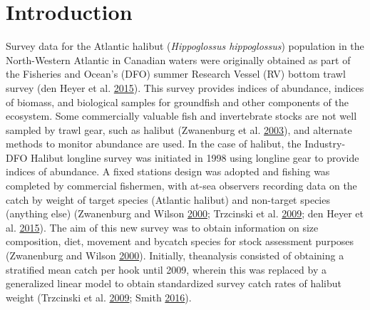 \documentclass[12pt]{article}\usepackage[]{graphicx}\usepackage[]{color}
\begin{document}

\frontmatter


\renewcommand{\headrulewidth}{0.5pt}  %
\renewcommand{\footrulewidth}{0.5pt}  %

\newcommand{\lt}{\ensuremath <}
\newcommand{\gt}{\ensuremath >}


\hypertarget{sec:introduction}{%
\section{Introduction}\label{sec:introduction}}

Survey data for the Atlantic halibut (\emph{Hippoglossus hippoglossus}) population in the North-Western Atlantic in Canadian waters were originally obtained as part of the Fisheries and Ocean's (DFO) summer Research Vessel (RV) bottom trawl survey (den Heyer et al. \protect\hyperlink{ref-DenHeyer2015}{2015}). This survey provides indices of abundance, indices of biomass, and biological samples for groundfish and other components of the ecosystem. Some commercially valuable fish and invertebrate stocks are not well sampled by trawl gear, such as halibut (Zwanenburg et al. \protect\hyperlink{ref-Zwanenburg2003}{2003}), and alternate methods to monitor abundance are used. In the case of halibut, the Industry-DFO Halibut longline survey was initiated in 1998 using longline gear to provide indices of abundance. A fixed stations design was adopted and fishing was completed by commercial fishermen, with at-sea observers recording data on the catch by weight of target species (Atlantic halibut) and non-target species (anything else) (Zwanenburg and Wilson \protect\hyperlink{ref-Zwanenburg2000}{2000}; Trzcinski et al. \protect\hyperlink{ref-Trzcinski2009}{2009}; den Heyer et al. \protect\hyperlink{ref-DenHeyer2015}{2015}). The aim of this new survey was to obtain information on size composition, diet, movement and bycatch species for stock assessment purposes (Zwanenburg and Wilson \protect\hyperlink{ref-Zwanenburg2000}{2000}). Initially, theanalysis consisted of obtaining a stratified mean catch per hook until 2009, wherein this was replaced by a generalized linear model to obtain standardized survey catch rates of halibut weight (Trzcinski et al. \protect\hyperlink{ref-Trzcinski2009}{2009}; Smith \protect\hyperlink{ref-Smith2016a}{2016}).
\end{document}
